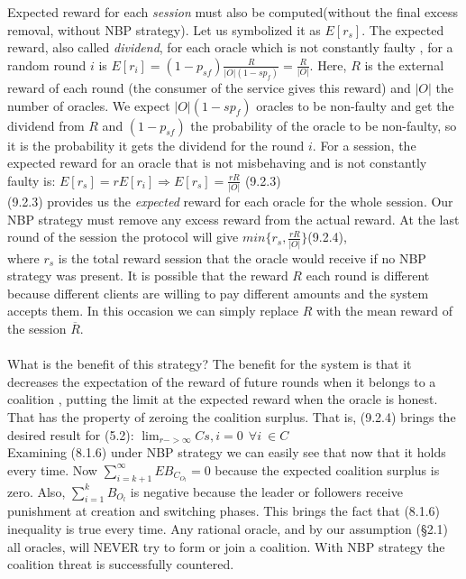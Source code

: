 \documentclass{article}
\begin{document}
{Expected reward for each \emph{session} must also be computed(without the final excess removal, without NBP strategy). Let us symbolized it as $E[r_s]$. The expected reward, also called \emph{dividend}, for each oracle which is not constantly faulty , for a random round $i$ is $E[r_i]=(1-p_{sf})\frac{R}{|O|(1-s{p_f})}=\frac{R}{|O|}$. Here, $R$ is the external reward of each round (the consumer of the service gives this reward) and $|O|$ the number of oracles. We expect $|O|(1-s{p_f})$ oracles to be non-faulty and get the dividend from $R$ and $(1-p_{sf})$ the probability of the oracle to be non-faulty, so it is the probability it gets the dividend for the round $i$. For a session, the expected reward for an oracle that is not misbehaving and is not constantly faulty is:
$E[r_s]=rE[r_i]\Rightarrow E[r_s]=\frac{rR}{|O|}$ (9.2.3)\\
(9.2.3) provides us the \emph{expected} reward for each oracle for the whole session. Our NBP strategy must remove any excess reward from the actual reward. At the last round of the session the protocol will give $min\{r_s,\frac{rR}{|O|}\}$(9.2.4),\\ 
where $r_s$ is the total reward session that the oracle would receive if no NBP strategy was present. It is possible that the reward $R$ each round is different because different clients are willing to pay different amounts and the system accepts them. In this occasion we can simply replace $R$ with the mean reward of the session $\overline{R}$.
\paragraph{ }
What is the benefit of this strategy? The benefit for the system is that it decreases the expectation of the reward of future rounds when it belongs to a coalition , putting the limit at the expected reward when the oracle is honest. That has the property of zeroing the coalition surplus. That is, (9.2.4) brings the desired result for (5.2): $\lim_{r->\infty}C{s,i}=0 ~~\forall i ~\in C$\\
Examining (8.1.6) under NBP strategy we can easily see that now that it holds every time. Now $\displaystyle\sum^{\infty}_{i=k+1}EB_{C_{O_l}}=0$ because the expected coalition surplus is zero. Also, $\displaystyle\sum^{k}_{i=1}B_{O_l}$ is negative because the leader or followers receive punishment at creation and switching phases. This brings the fact that (8.1.6) inequality is true every time. Any rational oracle, and by our assumption (§2.1) all oracles, will NEVER try to form or join a coalition. With NBP strategy the coalition threat is successfully countered.


}
\end{document}
